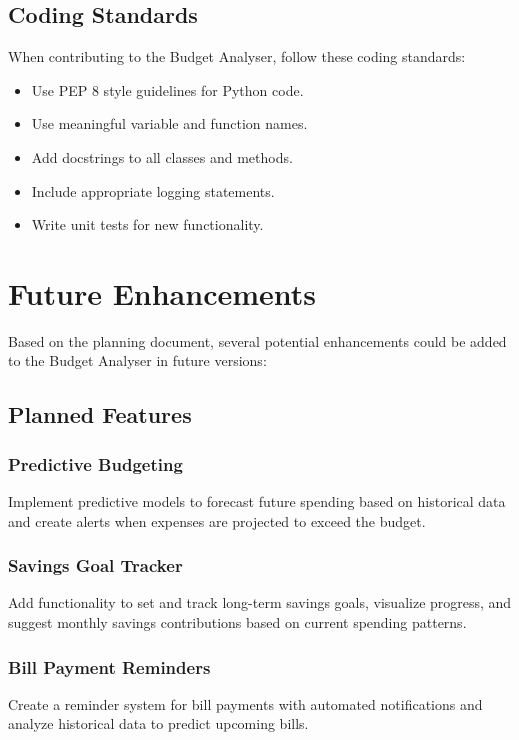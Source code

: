 \documentclass[11pt,a4paper]{report}
\begin{document}
\section{Coding Standards}
When contributing to the Budget Analyser, follow these coding standards:

\begin{itemize}
    \item Use PEP 8 style guidelines for Python code.
    \item Use meaningful variable and function names.
    \item Add docstrings to all classes and methods.
    \item Include appropriate logging statements.
    \item Write unit tests for new functionality.
\end{itemize}

\chapter{Future Enhancements}

Based on the planning document, several potential enhancements could be added to the Budget Analyser in future versions:

\section{Planned Features}

\subsection{Predictive Budgeting}
Implement predictive models to forecast future spending based on historical data and create alerts when expenses are projected to exceed the budget.

\subsection{Savings Goal Tracker}
Add functionality to set and track long-term savings goals, visualize progress, and suggest monthly savings contributions based on current spending patterns.

\subsection{Bill Payment Reminders}
Create a reminder system for bill payments with automated notifications and analyze historical data to predict upcoming bills.
\end{document}
